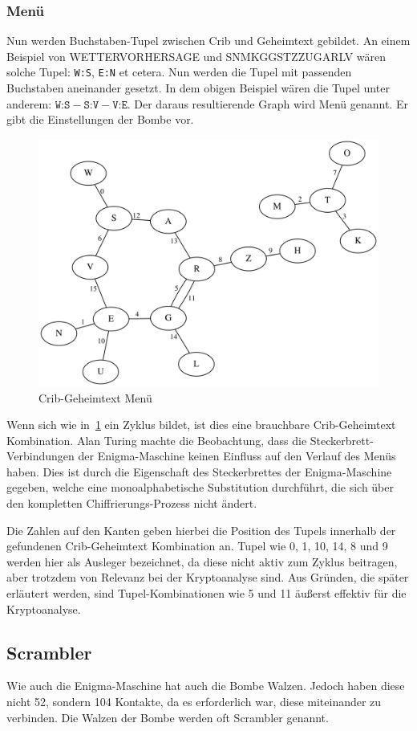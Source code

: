 \subsubsection{Menü}\label{subsubsec:menu}
Nun werden Buchstaben-Tupel zwischen Crib und Geheimtext gebildet.
An einem Beispiel von \glqq WETTERVORHERSAGE\grqq{} und \glqq SNMKGGSTZZUGARLV\grqq{} wären solche Tupel: \texttt{W:S}, \texttt{E:N} et cetera.
Nun werden die Tupel mit passenden Buchstaben aneinander gesetzt. 
In dem obigen Beispiel wären die Tupel unter anderem: $\texttt{W:S} - \texttt{S:V} - \texttt{V:E}$.
Der daraus resultierende Graph wird \glqq Menü\grqq{} genannt.
Er gibt die Einstellungen der Bombe vor.
\nopagebreak
\begin{figure}[htbp]
	\centering
	\includegraphics[width=.6\linewidth]{crib_cipher_cycle}
	\caption{Crib-Geheimtext Menü}
	\label{fig:crib_cipher_cycle}
\end{figure}

Wenn sich wie in~\cref{fig:crib_cipher_cycle} ein Zyklus bildet, ist dies eine brauchbare Crib-Geheimtext Kombination.
Alan Turing machte die Beobachtung, dass die Steckerbrett-Verbindungen der Enigma-Maschine keinen Einfluss auf den Verlauf des Menüs haben.
Dies ist durch die Eigenschaft des Steckerbrettes der Enigma-Maschine gegeben, welche eine monoalphabetische Substitution durchführt, die sich über den kompletten Chiffrierungs-Prozess nicht ändert.

Die Zahlen auf den Kanten geben hierbei die Position des Tupels innerhalb der gefundenen Crib-Geheimtext Kombination an.
Tupel wie 0, 1, 10, 14, 8 und 9 werden hier als \glqq Ausleger\grqq{} bezeichnet, da diese nicht aktiv zum Zyklus beitragen, aber trotzdem von Relevanz bei der Kryptoanalyse sind.
Aus Gründen, die später erläutert werden, sind Tupel-Kombinationen wie 5 und 11 äußerst effektiv für die Kryptoanalyse.


\newpage

\subsection{Scrambler}\label{subsec:scrambler}
Wie auch die Enigma-Maschine hat auch die Bombe \glqq Walzen\grqq.
Jedoch haben diese nicht 52, sondern 104 Kontakte, da es erforderlich war, diese miteinander zu verbinden.
Die Walzen der Bombe werden oft Scrambler genannt.

